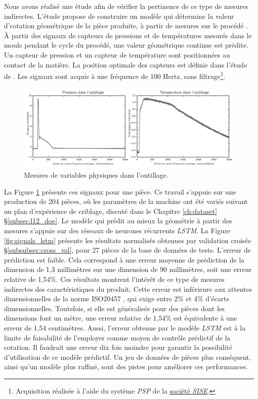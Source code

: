 Nous avons réalisé une étude afin de vérifier la pertinence de ce type de mesures indirectes.
L'étude  propose de construire un modèle qui détermine la valeur d'cotation géométrique de la pièce produite, à partir de mesures sur le procédé \cite{nagorny_quality_2017}.
À partir des signaux de capteurs de pressions et de températures mesurés dans le moule pendant le cycle du procédé, une valeur géométrique continue est prédite.
Un capteur de pression et un capteur de température sont positionnées au contact de la matière.
La position optimale des capteurs est définie dans l'étude de \citeauthor{agazzi_optimal_2013} \cite{agazzi_optimal_2013}.
Les signaux sont acquis à une fréquence de 100 Hertz, sans filtrage\footnote{Acquisition réalisée à l'aide du système \textit{PSP} de la \href{http://www.sise-plastics.com/}{société \textit{SISE}}.}.

\begin{figure}[bthp]
	\centering
	\includegraphics[width=\textwidth]{../Chap2/Figures/part1_std_signals.png}
	\caption{Mesures de variables physiques dans l'outillage.}
	\label{fig:inmold_signals}
\end{figure}

La Figure \ref{fig:inmold_signals} présente ces signaux pour une pièce.
Ce travail s'appuie sur une production de 204 pièces, où les paramètres de la machine ont été variés suivant un plan d'expérience de criblage, discuté dans le Chapitre \ref{ch:dataset} §\ref{subsec:l12_doe}.
Le modèle qui prédit au mieux la géométrie à partir des mesures s'appuie sur des réseaux de neurones récurrents \textit{LSTM}.
La Figure \ref{fig:signals_lstm} présente les résultats normalisés obtenues par validation croisée §\ref{subsubsec:cross_val}, pour 27 pièces de la base de données de tests.
L'erreur de prédiction est faible.
Cela correspond à une erreur moyenne de prédiction de la dimension de 1,3 millimètres sur une dimension de 90 millimètres, soit une erreur relative de 1,54\%.
Ces résultats montrent l'intérêt de ce type de mesures indirectes des caractéristiques du produit.
Cette erreur est inférieure aux attentes dimensionnelles de la norme ISO20457 \cite{ISO_20457_2018}, qui exige entre 2\% et 4\% d'écarts dimensionnelles.
Toutefois, si elle est généralisée pour des pièces dont les dimensions font un mètre, une erreur relative de 1,54\% est équivalente à une erreur de 1,54 centimètres.
Aussi, l'erreur obtenue par le modèle \textit{LSTM} est à la limite de faisabilité de l'employer comme moyen de contrôle prédictif de la cotation.
Il faudrait une erreur dix fois moindre pour garantir la possibilité d'utilisation de ce modèle prédictif.
Un jeu de données de pièces plus conséquent, ainsi qu'un modèle plus raffiné, sont des pistes pour améliorer ces performances.

